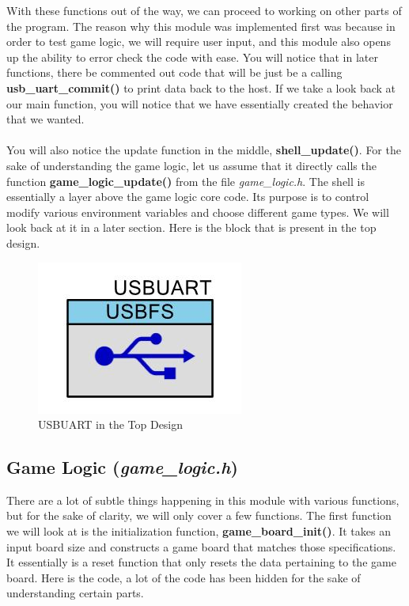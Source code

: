 \documentclass[a4paper, 12pt]{article}
\begin{document}
    With these functions out of the way, we can proceed to working on other
    parts of the program. The reason why this module was implemented first
    was because in order to test game logic, we will require user input, and
    this module also opens up the ability to error check the code with ease.
    You will notice that in later functions, there be commented out code
    that will be just be a calling \textbf{usb\_uart\_commit()} to print
    data back to the host. If we take a look back at our main function, you
    will notice that we have essentially created the behavior that we
    wanted. 
    \\ \\
    You will also notice the update function in the middle,
    \textbf{shell\_update()}. For the sake of understanding the game logic, let
    us assume that it directly calls the function \textbf{game\_logic\_update()} from the
    file \textit{game\_logic.h}. The shell is essentially a layer above the
    game logic core code. Its purpose is to control modify various
    environment variables and choose different game types. We will look back
    at it in a later section. Here is the block that is present in the top design.

    \begin{figure}[H]
        \centering
        \includegraphics[scale=0.7]{pics/usb_uart}
        \caption{USBUART in the Top Design}
        \label{fig:TopDesign}
    \end{figure}



    
    \subsection{Game Logic (\textit{game\_logic.h})}

    There are a lot of subtle things happening in this module with various
    functions, but for the sake of clarity, we will only cover a few
    functions. The first function we will look at is the initialization
    function, \textbf{game\_board\_init()}. It takes an input board size and 
    constructs a game board that matches those specifications. It essentially
    is a reset function that only resets the data pertaining to the game
    board. Here is the code, a lot of the code has been hidden for the sake
    of understanding certain parts.
\end{document}
